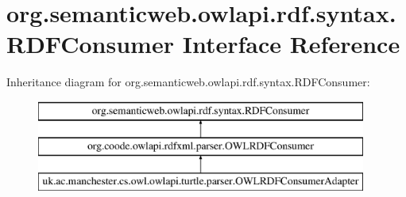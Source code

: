 \hypertarget{interfaceorg_1_1semanticweb_1_1owlapi_1_1rdf_1_1syntax_1_1_r_d_f_consumer}{\section{org.\-semanticweb.\-owlapi.\-rdf.\-syntax.\-R\-D\-F\-Consumer Interface Reference}
\label{interfaceorg_1_1semanticweb_1_1owlapi_1_1rdf_1_1syntax_1_1_r_d_f_consumer}
}
Inheritance diagram for org.\-semanticweb.\-owlapi.\-rdf.\-syntax.\-R\-D\-F\-Consumer\-:\begin{figure}[H]
\begin{center}
\leavevmode
\includegraphics[height=3.000000cm]{interfaceorg_1_1semanticweb_1_1owlapi_1_1rdf_1_1syntax_1_1_r_d_f_consumer}
\end{center}
\end{figure}
